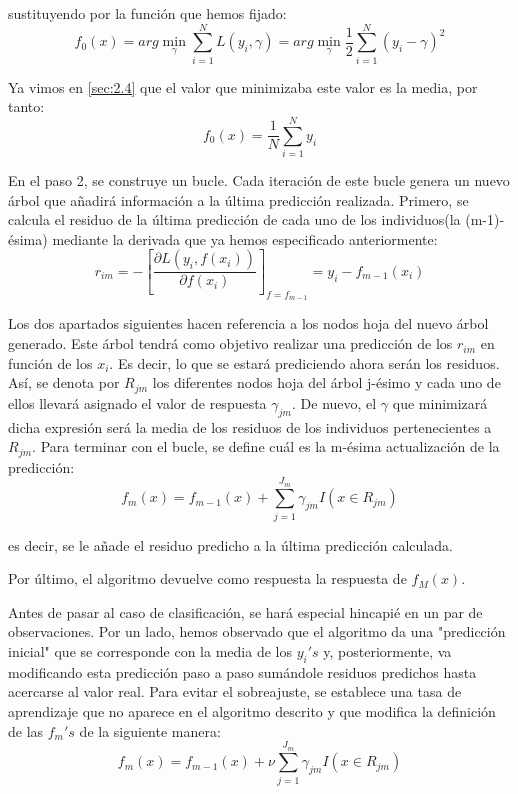\documentclass[12pt,twoside]{article}
\begin{document}
\noindent
sustituyendo por la función que hemos fijado:
\begin{equation*}
f_0(x) = arg\min_{\gamma} \sum_{i=1}^N L(y_i, \gamma) = arg\min_{\gamma} \frac{1}{2}\sum_{i=1}^N (y_i - \gamma)^2 
\end{equation*}

Ya vimos en \ref{sec:2.4} que el valor que minimizaba este valor es la media, por tanto:
\begin{equation*}
f_0(x) = \frac{1}{N} \sum_{i=1}^N y_i
\end{equation*}

En el paso 2, se construye un bucle. Cada iteración de este bucle genera un nuevo árbol que añadirá información a la última predicción realizada. Primero, se calcula el residuo de la última predicción de cada uno de los individuos(la (m-1)-ésima) mediante la derivada que ya hemos especificado anteriormente:
\begin{equation*}
r_{im} = - \left[ \frac{\partial L(y_i, f(x_i))}{\partial f(x_i)} \right]_{f = f_{m-1}} = y_i -f_{m-1}(x_i)
\end{equation*}

\noindent
Los dos apartados siguientes hacen referencia a los nodos hoja del nuevo árbol generado. Este árbol tendrá como objetivo realizar una predicción de los $r_{im}$ en función de los $x_i$. Es decir, lo que se estará prediciendo ahora serán los residuos. Así, se denota por $R_{jm}$ los diferentes nodos hoja del árbol j-ésimo y cada uno de ellos llevará asignado el valor de respuesta $\gamma_{jm}$. De nuevo, el $\gamma$ que minimizará dicha expresión será la media de los residuos de los individuos pertenecientes a $R_{jm}$. Para terminar con el bucle, se define cuál es la m-ésima actualización de la predicción:
\begin{equation*}
f_m(x) = f_{m-1}(x) + \sum_{j = 1}^{J_m}\gamma_{jm} I(x \in R_{jm})
\end{equation*}

\noindent
es decir, se le añade el residuo predicho a la última predicción calculada.

Por último, el algoritmo devuelve como respuesta la respuesta de $f_M(x)$.

Antes de pasar al caso de clasificación, se hará especial hincapié en un par de observaciones. Por un lado, hemos observado que el algoritmo da una "predicción inicial" que se corresponde con la media de los $y_i's$ y, posteriormente, va modificando esta predicción paso a paso sumándole residuos predichos hasta acercarse al valor real. Para evitar el sobreajuste, se establece una tasa de aprendizaje que no aparece en el algoritmo descrito y que modifica la definición de las $f_m's$ de la siguiente manera:
\begin{equation*}
f_m(x) = f_{m-1}(x) + \nu \sum_{j = 1}^{J_m}\gamma_{jm} I(x \in R_{jm})
\end{equation*}
\end{document}
